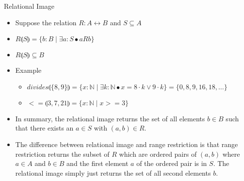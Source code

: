 \documentclass[aspectratio=169]{beamer}
\begin{document}
\begin{frame}{Relational Image}
\begin{itemize}
    \item Suppose the relation $R : A \leftrightarrow B$ and $S \subseteq A$
    \item $R \limg S \rimg = \{b : B \mid \exists a : S \bullet a R b\}$
    \item $R \limg S \rimg \subseteq B$
    \item Example
    \begin{itemize}
        \item $divides \limg \{8, 9\} \rimg = \{x : \mathbb{N} \mid \exists k : \mathbb{N} \bullet x = 8 \cdot k \vee 9 \cdot k \} = \{0, 8, 9, 16, 18, \ldots\}$
        \item $<= \limg {3, 7, 21} \rimg = \{x : \mathbb{N} \mid x >= 3\}$ 
    \end{itemize}
    \item In summary, the relational image returns the set of all elements $b \in B$ such that there exists an $a \in S$ with $(a, b) \in R$.
    \item The difference between relational image and range restriction is that range restriction returns the subset of $R$ which are ordered pairs of $(a, b)$ where $a \in A$ and $b \in B$ and the first element $a$ of the ordered pair is in $S$. The relational image simply just returns the set of all second elements $b$.
\end{itemize}
\end{frame}
\end{document}
